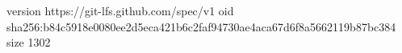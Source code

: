 version https://git-lfs.github.com/spec/v1
oid sha256:b84c5918e0080ee2d5eca421b6c2faf94730ae4aca67d6f8a5662119b87bc384
size 1302
